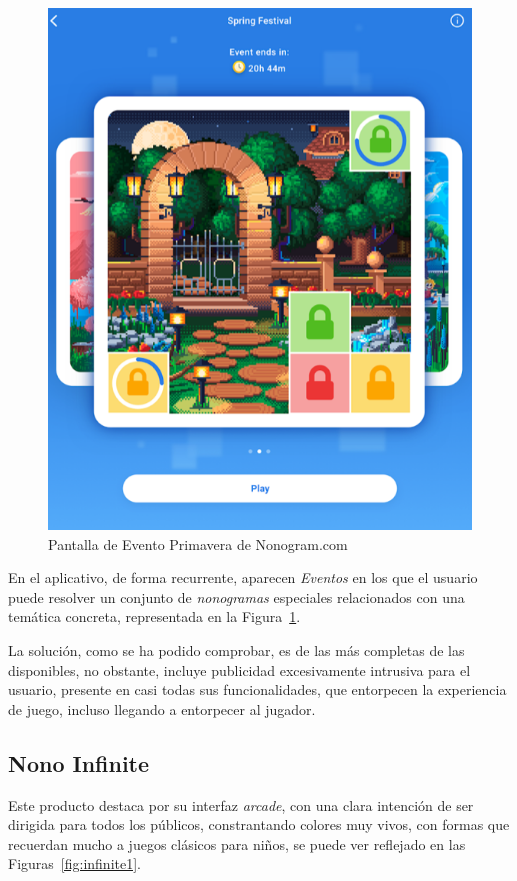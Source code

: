 \documentclass[11pt,spanish,listoffigures,listoftables]{tfgetsinf}
\begin{document}
\begin{figure}[H]
   \centering
   \includegraphics[scale=.25]{images/picturecross3.png}
   \caption{Pantalla de Evento Primavera de Nonogram.com}
   \label{fig:picture2}
 \end{figure}

En el aplicativo, de forma recurrente, aparecen \textit{Eventos} en los que el usuario puede resolver un conjunto de \textit{nonogramas} especiales relacionados
con una temática concreta, representada en la Figura~\ref{fig:picture2}.
 
La solución, como se ha podido comprobar, es de las más completas de las disponibles, no obstante, incluye publicidad excesivamente intrusiva para el usuario,
presente en casi todas sus funcionalidades, que entorpecen la experiencia de juego, incluso llegando a entorpecer al jugador.

\subsection{Nono Infinite}
Este producto destaca por su interfaz \textit{arcade}, con una clara intención de ser dirigida para todos los públicos, constrantando colores muy vivos,
con formas que recuerdan mucho a juegos clásicos para niños, se puede ver reflejado en las Figuras~\ref{fig:infinite1}.
\end{document}
